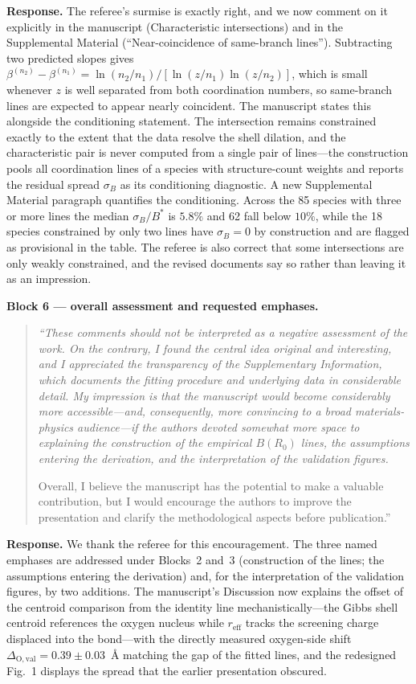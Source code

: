 \documentclass[11pt]{article}
\newenvironment{refquote}%
  {\begin{quote}\itshape\color{black!70}}%
  {\end{quote}}
\begin{document}
\textbf{Response.}  The referee's surmise is exactly right, and we now
comment on it explicitly in the manuscript (Characteristic
intersections) and in the Supplemental Material (``Near-coincidence
of same-branch lines'').  Subtracting two predicted slopes gives
$\beta^{(n_2)}-\beta^{(n_1)}=\ln(n_2/n_1)/[\ln(z/n_1)\ln(z/n_2)]$,
which is small whenever $z$ is well separated from both coordination
numbers, so same-branch lines are expected to appear nearly
coincident.  The manuscript states this alongside the conditioning
statement.  The intersection remains constrained exactly to the extent
that the data resolve the shell dilation, and the characteristic pair
is never computed from a single pair of lines---the construction pools
all coordination lines of a species with structure-count weights and
reports the residual spread $\sigma_B$ as its conditioning diagnostic.
A new Supplemental Material paragraph quantifies the conditioning.
Across the 85 species with three or more lines the median
$\sigma_B/B^*$ is $5.8\%$ and 62 fall below $10\%$, while the 18
species constrained by only two lines have $\sigma_B=0$ by
construction and are flagged as provisional in the table.  The
referee is also correct that some intersections are only weakly
constrained, and the revised documents say so rather than leaving it
as an impression.

\textbf{Block 6 --- overall assessment and requested emphases.}

\begin{refquote}
``These comments should not be interpreted as a negative assessment of
the work.  On the contrary, I found the central idea original and
interesting, and I appreciated the transparency of the Supplementary
Information, which documents the fitting procedure and underlying
data in considerable detail.  My impression is that the manuscript
would become considerably more accessible---and, consequently, more
convincing to a broad materials-physics audience---if the authors
devoted somewhat more space to explaining the construction of the
empirical $B(R_0)$ lines, the assumptions entering the derivation,
and the interpretation of the validation figures.

Overall, I believe the manuscript has the potential to make a valuable
contribution, but I would encourage the authors to improve the
presentation and clarify the methodological aspects before
publication.''
\end{refquote}

\textbf{Response.}  We thank the referee for this encouragement.  The
three named emphases are addressed under Blocks~2 and~3 (construction
of the lines; the assumptions entering the derivation) and, for the
interpretation of the validation figures, by two additions.  The
manuscript's Discussion now explains the offset of the centroid
comparison from the identity line mechanistically---the Gibbs shell
centroid references the oxygen nucleus while $r_{\mathrm{eff}}$ tracks
the screening charge displaced into the bond---with the directly
measured oxygen-side shift $\Delta_{\mathrm{O,val}}=0.39\pm0.03$~\AA{}
matching the gap of the fitted lines, and the redesigned Fig.~1
displays the spread that the earlier presentation obscured.
\end{document}
